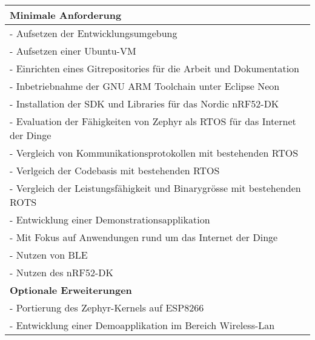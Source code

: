 \begin{table}[H]
	\renewcommand{\arraystretch}{1.5}
	\begin{tabular}{|l|}
		\hline
		\textbf{Minimale Anforderung}\\
		\hline
		- Aufsetzen der Entwicklungsumgebung\\
		\hspace{10pt}- Aufsetzen einer Ubuntu-VM\\
		\hspace{10pt}- Einrichten eines Gitrepositories für die Arbeit und Dokumentation\\
		\hspace{10pt}- Inbetriebnahme der GNU ARM Toolchain unter Eclipse Neon\\
		\hspace{10pt}- Installation der SDK und Libraries für das Nordic nRF52-DK\\
		- Evaluation der Fähigkeiten von Zephyr als RTOS für das Internet der Dinge\\
		\hspace{10pt}- Vergleich von Kommunikationsprotokollen mit bestehenden \ac{RTOS}\\
		\hspace{10pt}- Verlgeich der Codebasis mit bestehenden \ac{RTOS}\\
		\hspace{10pt}- Vergleich der Leistungsfähigkeit und Binarygrösse mit bestehenden \ac{ROTS}\\	
		- Entwicklung einer Demonstrationsapplikation\\
		\hspace{10pt}- Mit Fokus auf Anwendungen rund um das Internet der Dinge\\
		\hspace{10pt}- Nutzen von \ac{BLE}\\
		\hspace{10pt}- Nutzen des nRF52-DK\\
		\hline
		\hline
		\textbf{Optionale Erweiterungen}\\
		\hline
		- Portierung des Zephyr-Kernels auf ESP8266\\
		- Entwicklung einer Demoapplikation im Bereich Wireless-Lan\\
		\hline
	\end{tabular}
\end{table}
